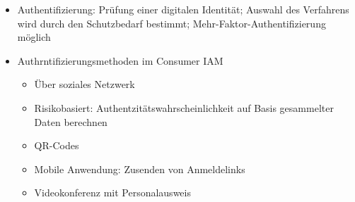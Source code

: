 \begin{itemize}
\begin{itemize}
		\item Authentifizierung: Prüfung einer digitalen Identität; Auswahl des Verfahrens wird durch den Schutzbedarf bestimmt; Mehr-Faktor-Authentifizierung möglich
		\item Authrntifizierungsmethoden im Consumer IAM
		\begin{itemize}
			\item Über soziales Netzwerk
			\item Risikobasiert: Authentzitätswahrscheinlichkeit auf Basis gesammelter Daten berechnen
			\item QR-Codes
			\item Mobile Anwendung: Zusenden von Anmeldelinks
			\item Videokonferenz mit Personalausweis
		\end{itemize}
	\end{itemize}
\end{itemize}









